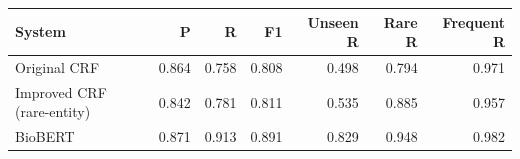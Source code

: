 \begin{tabular}{lrrrrrr}
\hline
System & P & R & F1 & Unseen R & Rare R & Frequent R \\
\hline
Original CRF & 0.864 & 0.758 & 0.808 & 0.498 & 0.794 & 0.971 \\
Improved CRF (rare-entity) & 0.842 & 0.781 & 0.811 & 0.535 & 0.885 & 0.957 \\
BioBERT & 0.871 & 0.913 & 0.891 & 0.829 & 0.948 & 0.982 \\
\hline
\end{tabular}
